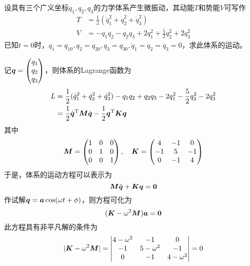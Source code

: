 \begin{question}[209页6.18]
设具有三个广义坐标$q_1,q_2,q_3$的力学体系产生微振动，其动能$T$和势能$V$可写作
\begin{align*}
	T & = \frac12 (\dot{q}_1^2 + \dot{q}_2^2 + \dot{q}_3^2) \\
	V & = -q_1q_2 - q_2q_3 + 2q_1^2 + \frac52 q_2^2 + 2q_3^2
\end{align*}
已知$t=0$时，$q_1 = q_{10},q_2 = q_{20},q_3 = q_{30},\dot{q}_1 = \dot{q}_2 = \dot{q}_3 = 0$，求此体系的运动。
\end{question}
\begin{solution}
记$\boldsymbol{q}=\begin{pmatrix} q_1 \\ q_2 \\ q_3 \end{pmatrix}$，则体系的Lagrange函数为
\begin{align*}
	L & = \frac12 (\dot{q}_1^2 + \dot{q}_2^2 + \dot{q}_3^2) - q_1q_2 + q_2q_3 - 2q_1^2 - \frac52 q_2^2 - 2q_3^2 \\
	& = \frac12 \dot{\boldsymbol{q}}^{\mathrm{T}} \boldsymbol{M} \dot{\boldsymbol{q}} - \frac12 \boldsymbol{q}^{\mathrm{T}} \boldsymbol{K} \boldsymbol{q}
\end{align*}
其中
\begin{equation*}
	\boldsymbol{M} = \begin{pmatrix} 1 & 0 & 0 \\ 0 & 1 & 0 \\ 0 & 0 & 1 \end{pmatrix},\quad \boldsymbol{K} = \begin{pmatrix} 4 & -1 & 0 \\ -1 & 5 & -1 \\ 0 & -1 & 4 \end{pmatrix}
\end{equation*}
于是，体系的运动方程可以表示为
\begin{equation*}
	\boldsymbol{M} \ddot{\boldsymbol{q}} + \boldsymbol{K} \boldsymbol{q} = \boldsymbol{0}
\end{equation*}
作试解$\boldsymbol{q} = \boldsymbol{a} \cos (\omega t+\phi)$，则方程可化为
\begin{equation*}
	(\boldsymbol{K}-\omega^2 \boldsymbol{M}) \boldsymbol{a} = \boldsymbol{0}
\end{equation*}
此方程具有非平凡解的条件为
\begin{equation*}
	|\mbf{K}-\omega^2 \mbf{M}| = \begin{vmatrix} 4-\omega^2 & -1 & 0 \\ -1 & 5-\omega^2 & -1 \\ 0 & -1 & 4-\omega^2 \end{vmatrix} = 0

\end{equation*}
\end{solution}
